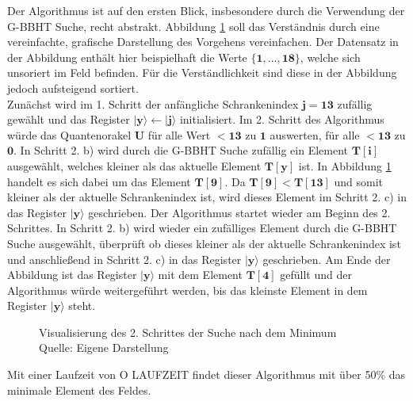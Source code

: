 Der Algorithmus ist auf den ersten Blick, insbesondere durch die Verwendung der G-BBHT Suche, recht abstrakt. 
Abbildung \ref{fig:sucheMinimumVisualisierung} soll das Verständnis durch eine vereinfachte, grafische Darstellung des Vorgehens vereinfachen. 
Der Datensatz in der Abbildung enthält hier beispielhaft die Werte $\mathbf{\{1, ..., 18\}}$, welche sich unsoriert im Feld befinden. Für die Verständlichkeit sind diese in der Abbildung jedoch aufsteigend sortiert.
\\
Zunächst wird im 1. Schritt der anfängliche Schrankenindex $\mathbf{j = 13}$ zufällig gewählt und das Register $\mathbf{|y\rangle \leftarrow |j\rangle}$ initialisiert. 
Im 2. Schritt des Algorithmus würde das Quantenorakel $\mathbf{U}$ für alle Wert $\mathbf{< 13}$ zu $\mathbf{1}$ auswerten, für alle $\mathbf{< 13}$ zu $\mathbf{0}$.
In Schritt 2. b) wird durch die G-BBHT Suche zufällig ein Element $\mathbf{T[i]}$ ausgewählt, welches kleiner als das aktuelle Element $\mathbf{T[y]}$ ist. 
In Abbildung \ref{fig:sucheMinimumVisualisierung} handelt es sich dabei um das Element $\mathbf{T[9]}$.
Da $\mathbf{T[9] < T[13]}$ und somit kleiner als der aktuelle Schrankenindex ist, wird dieses Element im Schritt 2. c) in das Register $\mathbf{|y\rangle}$ geschrieben.
Der Algorithmus startet wieder am Beginn des 2. Schrittes. In Schritt 2. b) wird wieder ein zufälliges Element durch die G-BBHT Suche ausgewählt, überprüft ob dieses kleiner als der aktuelle Schrankenindex ist und anschließend in Schritt 2. c) in das Register $\mathbf{|y\rangle}$ geschrieben.
Am Ende der Abbildung ist das Register $\mathbf{|y\rangle}$ mit dem Element $\mathbf{T[4]}$ gefüllt und der Algorithmus würde weitergeführt werden, bis das kleinste Element in dem Register $\mathbf{|y\rangle}$ steht.
\begin{figure}[hbtp]
	\centering
	\caption{Visualisierung des 2. Schrittes der Suche nach dem Minimum \\ Quelle: Eigene Darstellung}
	\label{fig:sucheMinimumVisualisierung}
\end{figure} 

Mit einer Laufzeit von O LAUFZEIT findet dieser Algorithmus mit über 50\% das minimale Element des Feldes.
